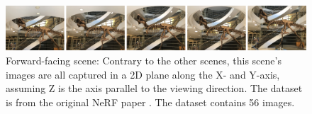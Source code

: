 \begin{figure}[!h]
    \centering
    \includegraphics[width=1.0\textwidth]{figures/trex-dataset.png}
    \caption{Forward-facing scene: Contrary to the other scenes, this scene's images are all captured in a 2D plane along the X- and Y-axis, assuming Z is the axis parallel to the viewing direction. The dataset is from the original NeRF paper \cite{mildenhall_nerf_2020}. The dataset contains 56 images.}
    \label{fig:trex-dataset}
\end{figure}
